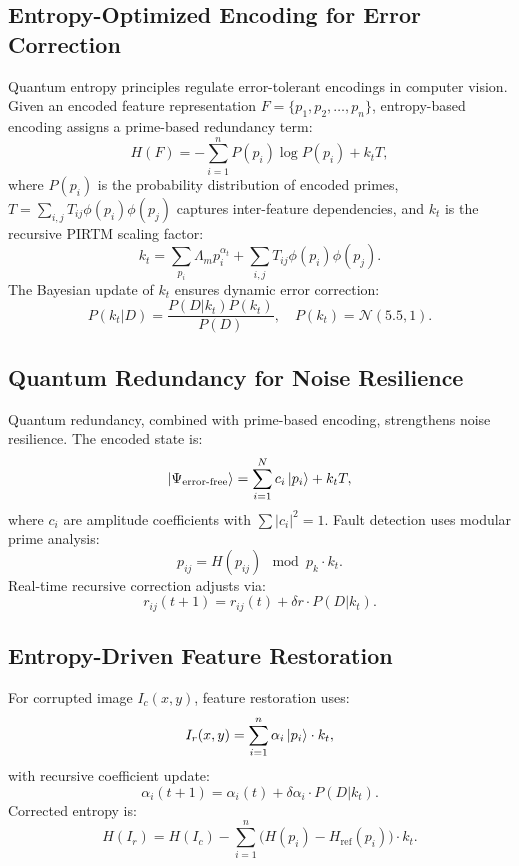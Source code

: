 \documentclass{article}
\theoremstyle{plain}
\begin{document}
\subsection{Entropy-Optimized Encoding for Error Correction}
Quantum entropy principles regulate error-tolerant encodings in computer vision. Given an encoded feature representation \( F = \{p_1, p_2, \dots, p_n\} \), entropy-based encoding assigns a prime-based redundancy term:
\begin{equation}
H(F) = -\sum_{i=1}^{n} P(p_i) \log P(p_i) + k_t T,
\end{equation}
where \( P(p_i) \) is the probability distribution of encoded primes, \( T = \sum_{i,j} T_{ij} \phi(p_i) \phi(p_j) \) captures inter-feature dependencies, and \( k_t \) is the recursive PIRTM scaling factor:
\begin{equation}
k_t = \sum_{p_i} \Lambda_m p_i^{\alpha_t} + \sum_{i,j} T_{ij} \phi(p_i) \phi(p_j).
\end{equation}
The Bayesian update of \( k_t \) ensures dynamic error correction:
\begin{equation}
P(k_t | D) = \frac{P(D | k_t) P(k_t)}{P(D)}, \quad P(k_t) = \mathcal{N}(5.5, 1).
\end{equation}

\subsection{Quantum Redundancy for Noise Resilience}
Quantum redundancy, combined with prime-based encoding, strengthens noise resilience. The encoded state is:
\begin{equation}
\ket{\Psi_\text{error-free}} = \sum_{i=1}^{N} c_i \ket{p_i} + k_t T,
\end{equation}
where \( c_i \) are amplitude coefficients with \( \sum |c_i|^2 = 1 \). Fault detection uses modular prime analysis:
\begin{equation}
p_{ij} = H(p_{ij}) \mod p_k \cdot k_t.
\end{equation}
Real-time recursive correction adjusts via:
\begin{equation}
r_{ij}(t+1) = r_{ij}(t) + \delta r \cdot P(D | k_t).
\end{equation}

\subsection{Entropy-Driven Feature Restoration}
For corrupted image \( I_c(x, y) \), feature restoration uses:
\begin{equation}
I_r(x, y) = \sum_{i=1}^{n} \alpha_i \ket{p_i} \cdot k_t,
\end{equation}
with recursive coefficient update:
\begin{equation}
\alpha_i(t+1) = \alpha_i(t) + \delta \alpha_i \cdot P(D | k_t).
\end{equation}
Corrected entropy is:
\begin{equation}
H(I_r) = H(I_c) - \sum_{i=1}^{n} \big(H(p_i) - H_\text{ref}(p_i)\big) \cdot k_t.
\end{equation}
\end{document}
